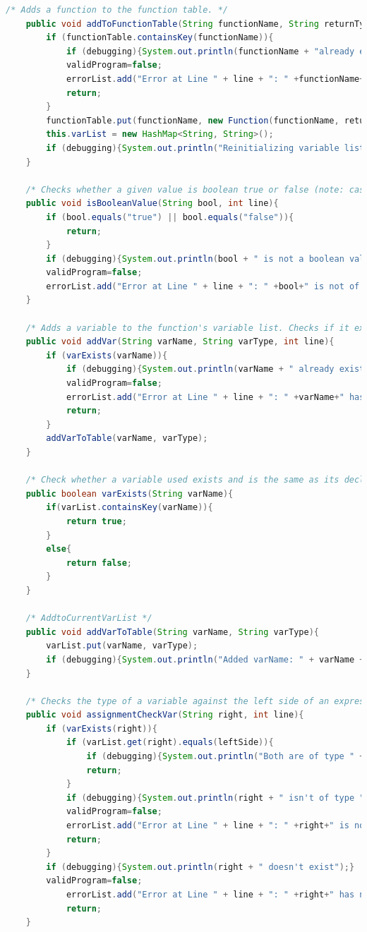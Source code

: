 \documentclass[12pt]{report}
\begin{document}
\begin{singlespace}
\begin{lstlisting}[language=Java,label=some-code,caption={Flood$\_$Sem.java}]
	/* Adds a function to the function table. */
	public void addToFunctionTable(String functionName, String returnType, String paramList, int line){
		if (functionTable.containsKey(functionName)){
			if (debugging){System.out.println(functionName + "already exists");}
			validProgram=false;
			errorList.add("Error at Line " + line + ": " +functionName+" has already been defined.");
			return;
		}
		functionTable.put(functionName, new Function(functionName, returnType, paramList, line));
		this.varList = new HashMap<String, String>();
		if (debugging){System.out.println("Reinitializing variable list");}
	}

	/* Checks whether a given value is boolean true or false (note: case specific) */
	public void isBooleanValue(String bool, int line){
		if (bool.equals("true") || bool.equals("false")){
			return;
		}
		if (debugging){System.out.println(bool + " is not a boolean value");}
		validProgram=false;
		errorList.add("Error at Line " + line + ": " +bool+" is not of type Bool.");
	}
	
	/* Adds a variable to the function's variable list. Checks if it exists first */
	public void addVar(String varName, String varType, int line){
		if (varExists(varName)){
			if (debugging){System.out.println(varName + " already exists");}
			validProgram=false;
			errorList.add("Error at Line " + line + ": " +varName+" has already been defined.");
			return;
		}
		addVarToTable(varName, varType);
	}

	/* Check whether a variable used exists and is the same as its declared type */
	public boolean varExists(String varName){
		if(varList.containsKey(varName)){
			return true;
		}
		else{
			return false;
		}
	}
	
	/* AddtoCurrentVarList */
	public void addVarToTable(String varName, String varType){
		varList.put(varName, varType);
		if (debugging){System.out.println("Added varName: " + varName + ", type: " + varType);}
	}

	/* Checks the type of a variable against the left side of an expression */
	public void assignmentCheckVar(String right, int line){
		if (varExists(right)){
			if (varList.get(right).equals(leftSide)){
				if (debugging){System.out.println("Both are of type " + leftSide);}
				return;
			}
			if (debugging){System.out.println(right + " isn't of type " + leftSide);}
			validProgram=false;
			errorList.add("Error at Line " + line + ": " +right+" is not of type "+leftSide+".");
			return;
		}
		if (debugging){System.out.println(right + " doesn't exist");}
		validProgram=false;
			errorList.add("Error at Line " + line + ": " +right+" has not been defined.");
			return;
	}


\end{lstlisting}
\end{singlespace}
\end{document}

